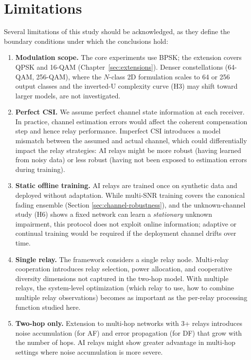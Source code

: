 \section{Limitations}\label{sec:limitations}

Several limitations of this study should be acknowledged, as they define the boundary conditions under which the conclusions hold:

\begin{enumerate}
\def\labelenumi{\arabic{enumi}.}
\item
  \textbf{Modulation scope.} The core experiments use BPSK; the extension covers QPSK and 16-QAM (Chapter~\ref{sec:extensions}). Denser constellations (64-QAM, 256-QAM), where the $N$-class 2D formulation scales to 64 or 256 output classes and the inverted-U complexity curve (H3) may shift toward larger models, are not investigated.
\item
  \textbf{Perfect CSI.} We assume perfect channel state information at each receiver. In practice, channel estimation errors would affect the coherent compensation step and hence relay performance. Imperfect CSI introduces a model mismatch between the assumed and actual channel, which could differentially impact the relay strategies: AI relays might be more robust (having learned from noisy data) or less robust (having not been exposed to estimation errors during training).
\item
  \textbf{Static offline training.} AI relays are trained once on synthetic data and deployed without adaptation. While multi-SNR training covers the canonical fading ensemble (Section \ref{sec:channel-robustness}), and the unknown-channel study (H6) shows a fixed network can learn a \emph{stationary} unknown impairment, this protocol does not exploit online information; adaptive or continual training would be required if the deployment channel drifts over time.
\item
  \textbf{Single relay.} The framework considers a single relay node. Multi-relay cooperation introduces relay selection, power allocation, and cooperative diversity dimensions not captured in the two-hop model. With multiple relays, the system-level optimization (which relay to use, how to combine multiple relay observations) becomes as important as the per-relay processing function studied here.
\item
  \textbf{Two-hop only.} Extension to multi-hop networks with 3+ relays introduces noise accumulation (for AF) and error propagation (for DF) that grow with the number of hops. AI relays might show greater advantage in multi-hop settings where noise accumulation is more severe.

\end{enumerate}
